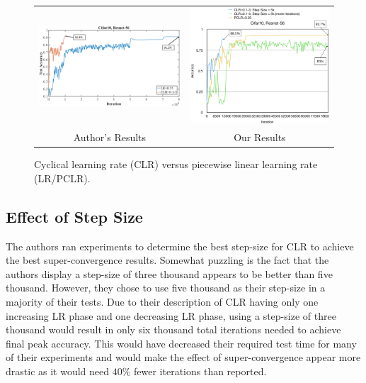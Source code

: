 \documentclass[10pt,twocolumn,letterpaper]{article}
\begin{document}
\begin{figure}[ht!]
    \begin{tabular}{cc}
        \includegraphics[trim=0 0 0 0, clip,
            width=3.25in]{images/figure_1a.png} &
        \includegraphics[trim=0 0 0 0, clip,
            width=3.25in]{images/clr_vs_pclr.png} \\
        Author's Results & Our Results \\
    \end{tabular}
    \caption{Cyclical learning rate (CLR) versus piecewise linear learning rate
    (LR/PCLR).}
    \label{fig:clr_vs_pclr}
\end{figure}

\subsection{Effect of Step Size}
The authors ran experiments to determine the best step-size for CLR to achieve
the best super-convergence results.  Somewhat puzzling is the fact that the
authors display a step-size of three thousand appears to be better than five
thousand. However, they chose to use five thousand as their step-size in a
majority of their tests. Due to their description of CLR having only one
increasing LR phase and one decreasing LR phase, using a step-size of three
thousand would result in only six thousand total iterations needed to achieve
final peak accuracy. This would have decreased their required test time for
many of their experiments and would make the effect of super-convergence appear
more drastic as it would need $40\%$ fewer iterations than reported.
\end{document}
